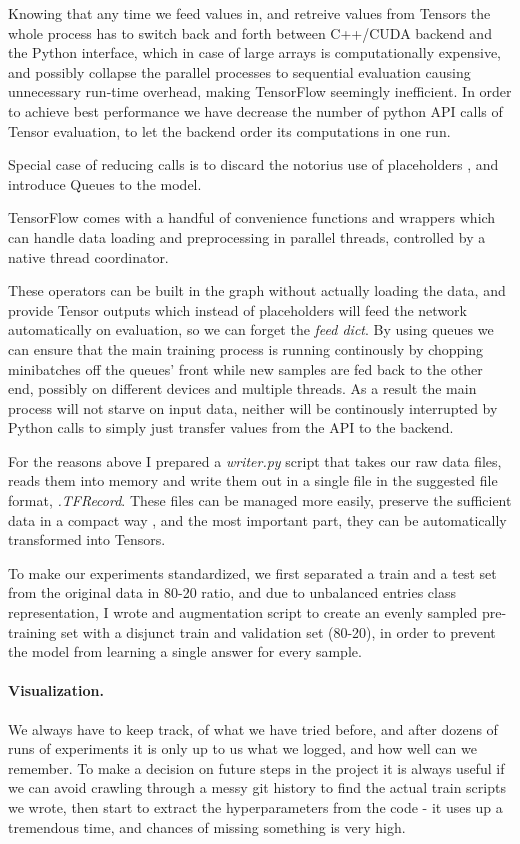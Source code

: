 Knowing that any time we feed values in, and retreive values from Tensors the whole process has to switch back and forth between C++/CUDA backend and the Python interface, which in case of large arrays is computationally expensive, and possibly collapse the parallel processes to sequential evaluation causing unnecessary run-time overhead, making TensorFlow seemingly inefficient.
In order to achieve best performance we have decrease the number of python API calls of Tensor evaluation, to let the backend order its computations in one run.

Special case of reducing calls is to discard the notorius use of placeholders \cite{placeholder-remove-MEDIUM-blog}, and introduce Queues to the model.

TensorFlow comes with a handful of convenience functions and wrappers which can handle data loading and preprocessing in parallel threads, controlled by a native thread coordinator.

These operators can be built in the graph without actually loading the data, and provide Tensor outputs which instead of placeholders will feed the network automatically on evaluation, so we can forget the \textit{feed dict}.
By using queues we can ensure that the main training process is running continously by chopping minibatches off the queues' front while new samples are fed back to the other end, possibly on different devices and multiple threads.
As a result the main process will not starve on input data, neither will be continously interrupted by Python calls to simply just transfer values from the API to the backend.

For the reasons above I prepared a \textit{writer.py} script that takes our raw data files, reads them into memory and write them out in a single file in the suggested file format, \textit{.TFRecord}.
These files can be managed more easily, preserve the sufficient data in a compact way \cite{tf-records-howto}, and the most important part, they can be automatically transformed into Tensors.

To make our experiments standardized, we first separated a train and a test set from the original data in 80-20 ratio, and due to unbalanced entries class representation, I wrote and augmentation script to create an evenly sampled pre-training set with a disjunct train and validation set (80-20), in order to prevent the model from learning a single answer for every sample.

\paragraph{Visualization.}
We always have to keep track, of what we have tried before, and after dozens of runs of experiments it is only up to us what we logged, and how well can we remember.
To make a decision on future steps in the project it is always useful if we can avoid crawling through a messy git history to find the actual train scripts we wrote, then start to extract the hyperparameters from the code - it uses up a tremendous time, and chances of missing something is very high.

